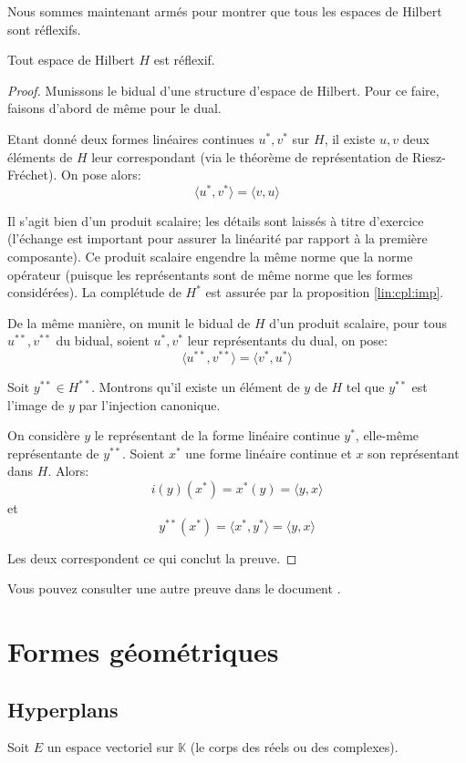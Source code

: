Nous sommes maintenant armés pour montrer que tous les espaces
de Hilbert sont réflexifs.

\begin{thm}
  Tout espace de Hilbert $H$ est réflexif.
\end{thm}

\begin{proof}
  Munissons le bidual d'une structure d'espace de Hilbert.
  Pour ce faire, faisons d'abord de même pour le dual.

  Etant donné deux formes linéaires continues $u^*, v^*$ sur $H$,
  il existe $u, v$ deux éléments de $H$ leur correspondant (via
  le théorème de représentation de Riesz-Fréchet). On pose
  alors:
  $$\langle u^*, v^*\rangle = \langle v, u \rangle$$

  Il s'agit bien d'un produit scalaire; les détails sont
  laissés à titre d'exercice (l'échange est important pour
  assurer la linéarité par rapport à la première composante).
  Ce produit scalaire engendre la même norme que la norme
  opérateur
  (puisque les représentants sont de même norme que
  les formes considérées). La complétude de $H^*$
  est assurée par la proposition \ref{lin:cpl:imp}.

  De la même manière, on munit le bidual de $H$ d'un
  produit scalaire, pour tous $u^{**}, v^{**}$ du bidual,
  soient $u^*, v^*$ leur représentants du dual, on pose:
    $$\langle u^{**}, v^{**}\rangle = \langle v^*, u^* \rangle$$

  Soit $y^{**}\in H^{**}$. Montrons qu'il existe un élément
  de $y$ de $H$ tel que $y^{**}$ est l'image de $y$ par
  l'injection canonique.

  On considère $y$ le représentant de la forme linéaire continue
  $y^*$, elle-même représentante de $y^{**}$. Soient $x^*$ une forme
  linéaire continue et $x$ son représentant dans $H$. Alors:
  $$i(y)(x^*) = x^*(y) = \langle y, x\rangle$$
  et
  $$y^{**}(x^*) = \langle x^*, y^{*} \rangle = \langle y, x\rangle$$

  Les deux correspondent ce qui  conclut la preuve.

\end{proof}

Vous pouvez consulter une autre preuve dans le document
\cite[p.~49]{refl:hilbert}.

\section{Formes géométriques}
\subsection{Hyperplans}
Soit $E$ un espace vectoriel sur $\mathbb{K}$
(le corps des réels ou des complexes).

